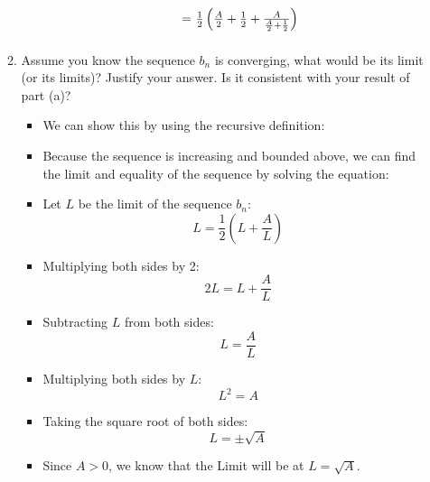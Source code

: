 \documentclass[12pt]{report}
\begin{document}
\begin{enumerate}[leftmargin=\labelsep]
\begin{enumerate}
\begin{tcolorbox}
\begin{itemize}[label={}]
\begin{equation*}
\begin{array}{r@{~=~}l}
                                & \frac{1}{2}\left(\frac{A}{2}+\frac{1}{2}+\frac{A}{\frac{A}{2}+\frac{1}{2}} \right) \\ [2ex]
                            \end{array}
                        \end{equation*}
                    \end{itemize}
                \end{tcolorbox}
\newpage
            \item Assume you know the sequence $b_n$ is converging, what would be its limit (or its limits)? Justify your answer. Is it consistent with your result of part (a)?
                \begin{tcolorbox}
                    \begin{itemize}[label={}]
                        \item We can show this by using the recursive definition:
                        \item Because the sequence is increasing and bounded above, we can find the limit and equality of the sequence by solving the equation:
                        \item Let $L$ be the limit of the sequence $b_n$:
                        \begin{equation*}
                            L=\frac{1}{2}\left(L+\frac{A}{L} \right)
                        \end{equation*}
                        \item Multiplying both sides by 2:
                        \begin{equation*}
                            2L=L+\frac{A}{L}
                        \end{equation*}
                        \item Subtracting $L$ from both sides:
                        \begin{equation*}
                            L=\frac{A}{L}
                        \end{equation*}
                        \item Multiplying both sides by $L$:
                        \begin{equation*}
                            L^2=A
                        \end{equation*}
                        \item Taking the square root of both sides:
                        \begin{equation*}
                            L=\pm \sqrt{A}
                        \end{equation*}
                        \item Since $A>0$, we know that the Limit will be at $L=\sqrt{A}$.
                    \end{itemize}
                \end{tcolorbox}
        \end{enumerate}


\end{enumerate}
\end{document}
